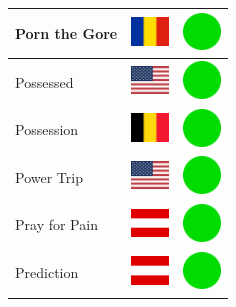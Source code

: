 \documentclass[12pt, a4paper, twoside]{report}
\begin{document}
\begin{center}
\begin{longtable}{|p{5cm}|p{2cm}|p{2cm}|}
 Porn the Gore                                              & \includegraphics[width=1cm]{../img/flags/ro} &   \includegraphics[width=1cm]{../likes/y} \\ \hline
 Possessed                                                  & \includegraphics[width=1cm]{../img/flags/us} &   \includegraphics[width=1cm]{../likes/y} \\ \hline
 Possession                                                 & \includegraphics[width=1cm]{../img/flags/be} &   \includegraphics[width=1cm]{../likes/y} \\ \hline
 Power Trip                                                 & \includegraphics[width=1cm]{../img/flags/us} &   \includegraphics[width=1cm]{../likes/y} \\ \hline
 Pray for Pain                                              & \includegraphics[width=1cm]{../img/flags/at} &   \includegraphics[width=1cm]{../likes/y} \\ \hline
 Prediction                                                 & \includegraphics[width=1cm]{../img/flags/at} &   \includegraphics[width=1cm]{../likes/y} \\ \hline

\end{longtable}
\end{center}
\end{document}
